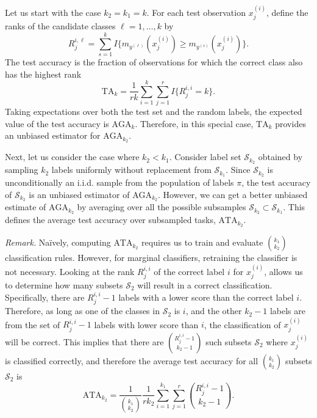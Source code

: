 \documentclass[twoside,11pt]{article}
\begin{document}
Let us start with the case $k_2 = k_1 = k$.  For each test observation
$x_j^{(i)}$, define the ranks of the candidate classes $\ell =
1,\hdots, k$ by
\[
R_{j}^{i, \ell} = \sum_{s = 1}^k I\{m_{y^{(\ell)}}(x_j^{(i)}) \geq m_{y^{(s)}}(x_j^{(i)})\}.
\]
The test accuracy is the fraction of observations for which the
correct class also has the highest rank
\begin{equation}\label{eq:test_risk}
\text{TA}_k = \frac{1}{r k} \sum_{i=1}^{k} \sum_{j=1}^{r} I\{R_j^{i,i} = k\}.
\end{equation}
Taking expectations over both the test set and the random labels, the
expected value of the test accuracy is $\text{AGA}_k$.  Therefore, in this special case, $\text{TA}_k$ provides an unbiased estimator for $\text{AGA}_{k_2}$.

Next, let us consider the case where $k_2 < k_1$.  Consider label set
$\mathcal{S}_{k_2}$ obtained by sampling $k_2$ labels uniformly
without replacement from $\mathcal{S}_{k_1}$. Since
$\mathcal{S}_{k_2}$ is unconditionally an i.i.d. sample from the
population of labels $\pi$, the test accuracy of $\mathcal{S}_{k_2}$
is an unbiased estimator of $\text{AGA}_{k_2}$.  However, we can get a
better unbiased estimate of $\text{AGA}_{k_2}$ by averaging over all
the possible subsamples $\mathcal{S}_{k_2} \subset \mathcal{S}_{k_1}$.
This defines the average test accuracy over subsampled tasks,
$\text{ATA}_{k_2}$.

\emph{Remark.}  Na\"{i}vely, computing $\text{ATA}_{k_2}$ requires us
to train and evaluate ${k_1}\choose{k_2}$ classification rules.
However, for marginal classifiers, retraining the classifier is not
necessary.  Looking at the rank $R_{j}^{i,i}$ of the correct label $i$
for $x_j^{(i)}$, allows us to determine how many subsets
$\mathcal{S}_2$ will result in a correct classification. Specifically,
there are $R_{j}^{i,i} - 1$ labels with a lower score than the correct
label $i$.  Therefore, as long as one of the classes in
$\mathcal{S}_2$ is $i$, and the other $k_2-1$ labels are from the set
of $R_{j}^{i,i}-1$ labels with lower score than $i$, the
classification of $x_j^{(i)}$ will be correct.  This implies that
there are ${R_{j}^{i,i}-1}\choose{k_2-1}$ such subsets $\mathcal{S}_2$
where $x_j^{(i)}$ is classified correctly, and therefore the average
test accuracy for all ${k_1}\choose{k_2}$ subsets $\mathcal{S}_2$ is
\begin{equation}\label{eq:avtestrisk}
\text{ATA}_{k_2} = \frac{1}{{{k_1}\choose{k_2}}}\frac{1}{r k_2} \sum_{i=1}^{k_1} \sum_{j=1}^{r} {{R_{j}^{i,i}-1}\choose{k_2-1}}.
\end{equation}
\end{document}
